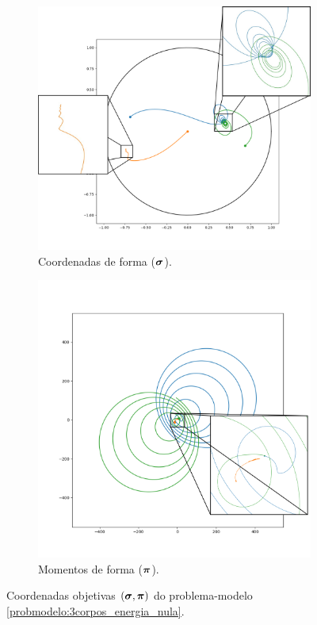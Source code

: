 \begin{figure}[H]
    \centering
    \begin{subfigure}{.5\textwidth}
        \centering
        \includegraphics[width=\linewidth]{tcc//img/3corpos_energia0_posicoes_sd_zoom.png}
        \caption{Coordenadas de forma ($\bm \sigma$).}
        \label{fig:3corpos_energia0_posicoes_sd}
    \end{subfigure}%
    \begin{subfigure}{.5\textwidth}
        \centering
        \includegraphics[width=\linewidth]{tcc//img/3corpos_energia0_velocidades_sd_zoom.png}
        \caption{Momentos de forma ($\bm \pi$).}
        \label{fig:3corpos_energia0_velocidades_sd}
    \end{subfigure}
    \caption{Coordenadas objetivas $(\bm \sigma, \bm \pi)$ do problema-modelo \ref{probmodelo:3corpos_energia_nula}.}
    \label{fig:probmodelo3corposenergia0_sd}
\end{figure}

